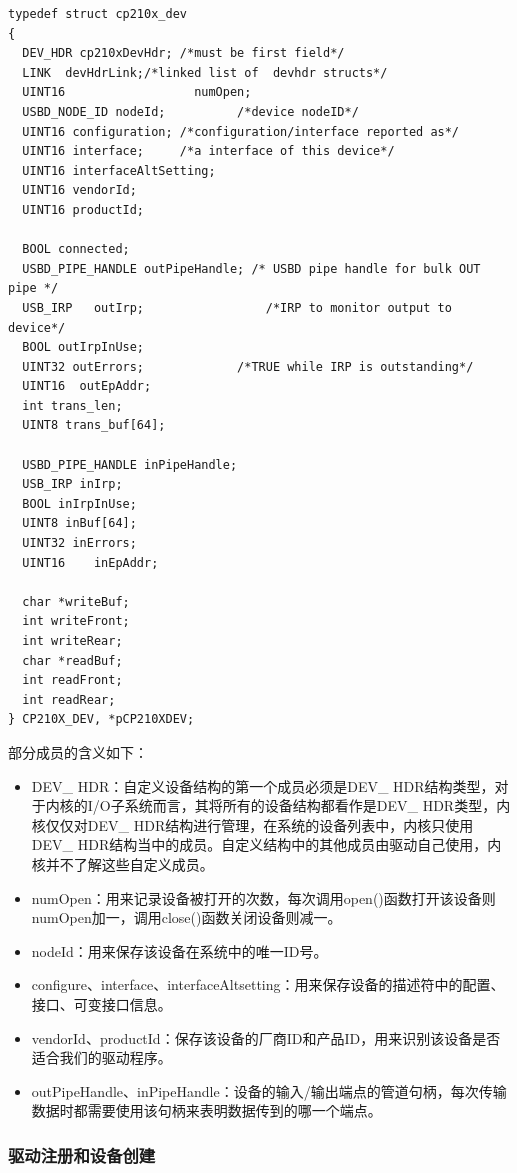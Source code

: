 \lstset{language=C}
\begin{lstlisting}
typedef struct cp210x_dev
{
  DEV_HDR cp210xDevHdr; /*must be first field*/
  LINK 	devHdrLink;/*linked list of  devhdr structs*/
  UINT16                  numOpen;
  USBD_NODE_ID nodeId;			/*device nodeID*/
  UINT16 configuration;	/*configuration/interface reported as*/
  UINT16 interface;		/*a interface of this device*/
  UINT16 interfaceAltSetting;
  UINT16 vendorId;
  UINT16 productId;

  BOOL connected;
  USBD_PIPE_HANDLE outPipeHandle; /* USBD pipe handle for bulk OUT pipe */
  USB_IRP	outIrp;					/*IRP to monitor output to device*/
  BOOL outIrpInUse;
  UINT32 outErrors;				/*TRUE while IRP is outstanding*/
  UINT16  outEpAddr;	
  int trans_len;
  UINT8 trans_buf[64];
  
  USBD_PIPE_HANDLE inPipeHandle;
  USB_IRP inIrp;
  BOOL inIrpInUse;
  UINT8 inBuf[64];
  UINT32 inErrors;
  UINT16 	inEpAddr;
	
  char *writeBuf;
  int writeFront;
  int writeRear;
  char *readBuf;
  int readFront;
  int readRear;
} CP210X_DEV, *pCP210XDEV;
\end{lstlisting}
\noindent 部分成员的含义如下：

\begin{itemize}
\item DEV\_ HDR：自定义设备结构的第一个成员必须是DEV\_ HDR结构类型，对于内核的I/O子系统而言，其将所有的设备结构都看作是DEV\_ HDR类型，内核仅仅对DEV\_ HDR结构进行管理，在系统的设备列表中，内核只使用DEV\_ HDR结构当中的成员。自定义结构中的其他成员由驱动自己使用，内核并不了解这些自定义成员。
\item numOpen：用来记录设备被打开的次数，每次调用open()函数打开该设备则numOpen加一，调用close()函数关闭设备则减一。
\item nodeId：用来保存该设备在系统中的唯一ID号。
\item configure、interface、interfaceAltsetting：用来保存设备的描述符中的配置、接口、可变接口信息。
\item vendorId、productId：保存该设备的厂商ID和产品ID，用来识别该设备是否适合我们的驱动程序。
\item outPipeHandle、inPipeHandle：设备的输入/输出端点的管道句柄，每次传输数据时都需要使用该句柄来表明数据传到的哪一个端点。
\end{itemize}

\subsubsection{驱动注册和设备创建} 
	
